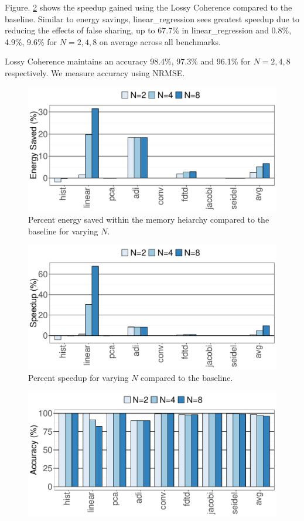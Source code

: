 Figure. \ref{fig:speedup} shows the speedup gained using the Lossy Coherence compared to the baseline. Similar to energy savings, linear\_regression sees greatest speedup due to reducing the effects of false sharing, up to 67.7\% in linear\_regression and 0.8\%, 4.9\%, 9.6\% for $N = {2,4,8}$ on average across all benchmarks.

Lossy Coherence maintains an accuracy 98.4\%, 97.3\% and 96.1\% for  $N = {2,4,8}$ respectively. We measure accuracy using NRMSE.





\begin{figure}[t]
	\centerline{\includegraphics[scale=0.4]{graphs/energy_saved.pdf}}
	\caption{Percent energy saved within the memory heiarchy compared to the baseline for varying $N$.}
\label{fig:energy}
\end{figure}

\begin{figure}[t]
	\centerline{\includegraphics[scale=0.4]{graphs/speedup.pdf}}
	\caption{Percent speedup for varying $N$ compared to the baseline.}
\label{fig:speedup}
\end{figure}



\begin{figure}[t]
	\centerline{\includegraphics[scale=0.4]{graphs/output_error.pdf}}
\label{fig:error}
\end{figure}
